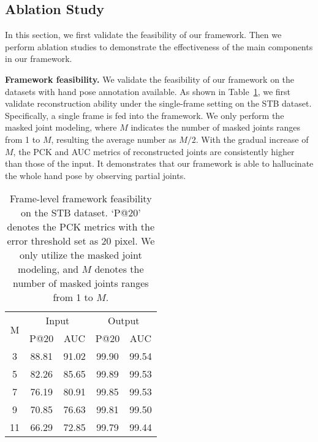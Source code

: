 \documentclass[10pt,twocolumn,letterpaper]{article}
\begin{document}
\subsection{Ablation Study}
In this section, we first validate the feasibility of our framework.
Then we perform ablation studies to demonstrate the effectiveness of the main components in our framework.


\noindent \textbf{Framework feasibility.}
We validate the feasibility of our framework on the datasets with hand pose annotation available.
As shown in Table~\ref{STB}, we first validate reconstruction ability under the single-frame setting on the STB dataset.
Specifically, a single frame is fed into the framework.
We only perform the masked joint modeling, where $M$ indicates the number of masked joints ranges from 1 to $M$, resulting the average number as $M/2$.
With the gradual increase of $M$, the PCK and AUC metrics of reconstructed joints are consistently higher than those of the input.
It demonstrates that our framework is able to hallucinate the whole hand pose by observing partial joints.



\begin{table}
\small
\tabcolsep=11pt
\begin{center}
\begin{tabular}{c|cc|cc}
\hline
\multirow{2}{*}{M}  & \multicolumn{2}{c|}{Input} & \multicolumn{2}{c}{Output} \\
   & P@20  & AUC   & P@20  & AUC \\ \hline \hline
3  & 88.81 & 91.02 & 99.90 & 99.54  \\
5  & 82.26 & 85.65 & 99.89 & 99.53  \\
7  & 76.19 & 80.91 & 99.85 & 99.53  \\
9  & 70.85 & 76.63 & 99.81 & 99.50  \\
11 & 66.29 & 72.85 & 99.79 & 99.44  \\ \hline
\end{tabular}
\end{center}
\caption{Frame-level framework feasibility on the STB dataset. `P@20' denotes the PCK metrics with the error threshold set as 20 pixel. We only utilize the masked joint modeling, and $M$ denotes the number of masked joints ranges from 1 to $M$.}
\label{STB}
\vspace{-0.3cm}
\end{table}
\end{document}
